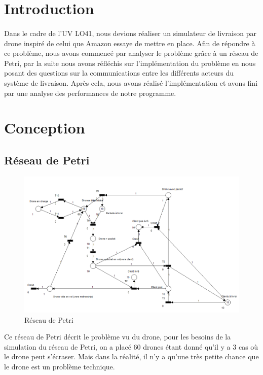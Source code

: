 \documentclass[article, backcover, french, nodocumentinfo]{upmethodology-document}
\begin{document}
	\upmdocumentsummary{}
	\upmdocumentauthors{}
	\upmdocumentinformedpeople{}
	\upmpublicationpage{}
	\thispagestyle{empty}
	\tableofcontents{}
	\newpage{}
	\section*{Introduction}
		\paragraph*{}
			Dans le cadre de l'UV LO41, nous devions réaliser un simulateur de livraison
			par drone inspiré de celui que Amazon essaye de mettre en place. Afin de répondre à ce problème, nous avons commencé par analyser le
			problème grâce à un réseau de Petri, par la suite nous avons réfléchis sur l'implémentation
			du problème en nous posant des questions sur la communications entre les différents
			acteurs du système de livraison. Après cela, nous avons réalisé l'implémentation et
			 avons fini par une analyse des performances de notre programme.
	\section{Conception}
		\subsection{Réseau de Petri}
			\begin{figure}[H]
			  \centering
			  \includegraphics[width=\textwidth]{figures/petri_drones}
			  \caption{Réseau de Petri}
			  \label{fig:petrinet}
			\end{figure}
			Ce réseau de Petri décrit le problème vu du drone, pour les besoins de la
			simulation du réseau de Petri, on a placé 60 drones étant donné qu'il y a 3
			cas où le drone peut s'écraser. Mais dans la réalité, il n'y a qu'une très
			petite chance que le drone est un problème technique.
\end{document}
